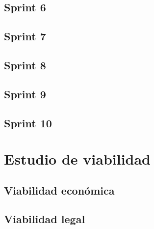 \subsection{Sprint 6}
\subsection{Sprint 7}
\subsection{Sprint 8}
\subsection{Sprint 9}
\subsection{Sprint 10}

\section{Estudio de viabilidad}

\subsection{Viabilidad económica}

\subsection{Viabilidad legal}


